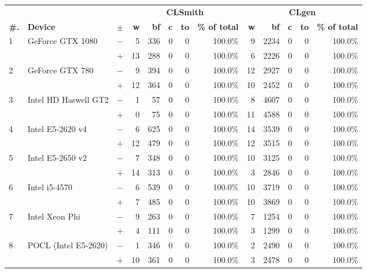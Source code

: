   \begin{tabular}{lll | rrrrr | rrrrr }
  \toprule
  & & & \multicolumn{5}{c|}{\textbf{CLSmith}} & \multicolumn{5}{c}{\textbf{CLgen}} \\
  \textbf{\#.} & \textbf{Device} & $\pm$ &
  \textbf{w} & \textbf{bf} & \textbf{c} & \textbf{to} & \textbf{\% of total} &
  \textbf{w} & \textbf{bf} & \textbf{c} & \textbf{to} & \textbf{\% of total} \\
  \midrule
  \multirow{ 2}{*}{1} & \multirow{ 2}{*}{GeForce GTX 1080} & $-$ & 5 & 336 & 0 & 0 & 100.0\%       & 9 & 2234 & 0 & 0 & 100.0\% \\& & $+$ & 13 & 288 & 0 & 0 & 100.0\% & 6 & 2226 & 0 & 0 & 100.0\% \\
\hline
\multirow{ 2}{*}{2} & \multirow{ 2}{*}{GeForce GTX 780} & $-$ & 9 & 394 & 0 & 0 & 100.0\%       & 12 & 2927 & 0 & 0 & 100.0\% \\& & $+$ & 12 & 364 & 0 & 0 & 100.0\% & 10 & 2452 & 0 & 0 & 100.0\% \\
\hline
\multirow{ 2}{*}{3} & \multirow{ 2}{*}{Intel HD Haswell GT2} & $-$ & 1 & 57 & 0 & 0 & 100.0\%       & 8 & 4607 & 0 & 0 & 100.0\% \\& & $+$ & 0 & 75 & 0 & 0 & 100.0\% & 11 & 4588 & 0 & 0 & 100.0\% \\
\hline
\multirow{ 2}{*}{4} & \multirow{ 2}{*}{Intel E5-2620 v4} & $-$ & 6 & 625 & 0 & 0 & 100.0\%       & 14 & 3539 & 0 & 0 & 100.0\% \\& & $+$ & 12 & 479 & 0 & 0 & 100.0\% & 12 & 3515 & 0 & 0 & 100.0\% \\
\hline
\multirow{ 2}{*}{5} & \multirow{ 2}{*}{Intel E5-2650 v2} & $-$ & 7 & 348 & 0 & 0 & 100.0\%       & 10 & 3125 & 0 & 0 & 100.0\% \\& & $+$ & 14 & 313 & 0 & 0 & 100.0\% & 3 & 2846 & 0 & 0 & 100.0\% \\
\hline
\multirow{ 2}{*}{6} & \multirow{ 2}{*}{Intel i5-4570} & $-$ & 6 & 539 & 0 & 0 & 100.0\%       & 10 & 3719 & 0 & 0 & 100.0\% \\& & $+$ & 7 & 485 & 0 & 0 & 100.0\% & 10 & 3869 & 0 & 0 & 100.0\% \\
\hline
\multirow{ 2}{*}{7} & \multirow{ 2}{*}{Intel Xeon Phi} & $-$ & 9 & 263 & 0 & 0 & 100.0\%       & 7 & 1254 & 0 & 0 & 100.0\% \\& & $+$ & 4 & 111 & 0 & 0 & 100.0\% & 3 & 1299 & 0 & 0 & 100.0\% \\
\hline
\multirow{ 2}{*}{8} & \multirow{ 2}{*}{POCL (Intel E5-2620)} & $-$ & 1 & 346 & 0 & 0 & 100.0\%       & 2 & 2490 & 0 & 0 & 100.0\% \\& & $+$ & 10 & 361 & 0 & 0 & 100.0\% & 3 & 2478 & 0 & 0 & 100.0\% \\

\end{tabular}
